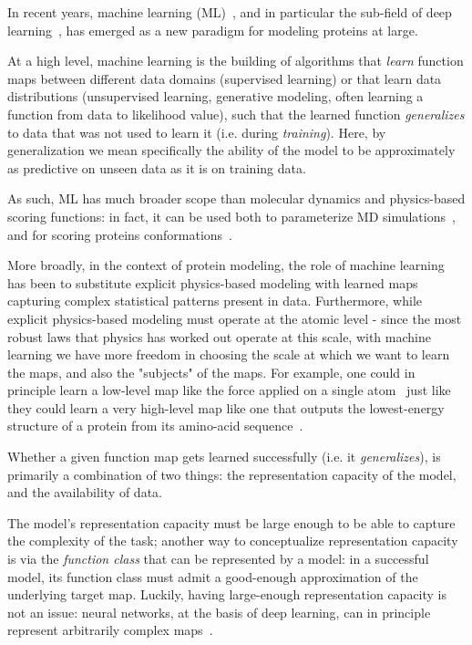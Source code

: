 In recent years, machine learning (ML)~\citep{bishop_pattern_2006}, and in particular the sub-field of deep learning~\citep{goodfellow_deep_2016},
has emerged as a new paradigm for modeling proteins at large.

At a high level, machine learning is the building of algorithms that \textit{learn} function maps between different data domains
(supervised learning) or that learn data distributions (unsupervised learning, generative modeling, often learning a function from data to likelihood value),
such that the learned function \textit{generalizes} to data that was not used to learn it (i.e. during \textit{training}).
Here, by generalization we mean specifically the ability of the model to be approximately as predictive on unseen data as it is on training data.

As such, ML has much broader scope than molecular dynamics and physics-based scoring functions: in fact, it can be used both to parameterize
MD simulations~\citep{musaelian_learning_2022}, and for scoring proteins conformations~\citep{roney_state---art_2022, roney_protein_2026}.

More broadly, in the context of protein modeling, the role of machine learning has been to substitute explicit physics-based modeling with
learned maps capturing complex statistical patterns present in data.
Furthermore, while explicit physics-based modeling must operate at the atomic level - since the most robust laws that physics has worked out
operate at this scale, with machine learning we have more freedom in choosing the scale at which we want to learn the maps, and also the 
"subjects" of the maps.
For example, one could in principle learn a low-level map like the force applied on a single atom~\citep{musaelian_learning_2022} just like they could
learn a very high-level map like one that outputs the lowest-energy structure of a protein from its amino-acid sequence~\citep{jumper_highly_2021}.

Whether a given function map gets learned successfully (i.e. it \textit{generalizes}), is primarily a combination of two things:
the representation capacity of the model, and the availability of data.

The model's representation capacity must be large enough to be able to capture the complexity of the task; another way to conceptualize 
representation capacity is via the \textit{function class} that can be represented by a model: in a successful model, its function class must
admit a good-enough approximation of the underlying target map.
Luckily, having large-enough representation capacity is not an issue: neural networks, at the basis of deep learning, can in principle
represent arbitrarily complex maps~\citep{cybenko_approximation_1989, hornik_multilayer_1989}.

